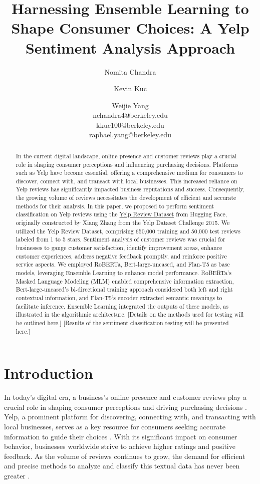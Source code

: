\documentclass[12pt]{article}
\title{Harnessing Ensemble Learning to Shape Consumer Choices: A Yelp Sentiment Analysis Approach}
\author{Nomita Chandra \and Kevin Kuc \and Weijie Yang \\
        nchandra4@berkeley.edu \\ kkuc100@berkeley.edu \\ raphael.yang@berkeley.edu}
\begin{document}
\maketitle
\begin{abstract}
  In the current digital landscape, online presence and customer reviews play a crucial role in shaping consumer perceptions and influencing purchasing decisions. Platforms such as Yelp have become essential, offering a comprehensive medium for consumers to discover, connect with, and transact with local businesses. This increased reliance on Yelp reviews has significantly impacted business reputations and success. Consequently, the growing volume of reviews necessitates the development of efficient and accurate methods for their analysis. In this paper, we proposed to perform sentiment classification on Yelp reviews using the \href{https://huggingface.co/datasets/Yelp/yelp_review_full}{Yelp Review Dataset} from Hugging Face, originally constructed by Xiang Zhang from the Yelp Dataset Challenge 2015. We utilized the Yelp Review Dataset, comprising 650,000 training and 50,000 test reviews labeled from 1 to 5 stars. Sentiment analysis of customer reviews was crucial for businesses to gauge customer satisfaction, identify improvement areas, enhance customer experiences, address negative feedback promptly, and reinforce positive service aspects. We employed RoBERTa, Bert-large-uncased, and Flan-T5 as base models, leveraging Ensemble Learning to enhance model performance. RoBERTa’s Masked Language Modeling (MLM) enabled comprehensive information extraction, Bert-large-uncased’s bi-directional training approach considered both left and right contextual information, and Flan-T5’s encoder extracted semantic meanings to facilitate inference. Ensemble Learning integrated the outputs of these models, as illustrated in the algorithmic architecture. [Details on the methods used for testing will be outlined here.] [Results of the sentiment classification testing will be presented here.]
\end{abstract}


\section{Introduction}
In today’s digital era, a business's online presence and customer reviews play a crucial role in shaping consumer perceptions and driving purchasing decisions \citep{luca2016reviews}. Yelp, a prominent platform for discovering, connecting with, and transacting with local businesses, serves as a key resource for consumers seeking accurate information to guide their choices \citep{lee2014impact}. With its significant impact on consumer behavior, businesses worldwide strive to achieve higher ratings and positive feedback. As the volume of reviews continues to grow, the demand for efficient and precise methods to analyze and classify this textual data has never been greater \citep{pang2008sentiment}.
\end{document}

